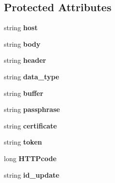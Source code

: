 \subsection*{Protected Attributes}
\begin{DoxyCompactItemize}
\item 
string {\bfseries host}\hypertarget{classRed_a881ca8a6ff3ead45a22065e1b08edc4b}{}\label{classRed_a881ca8a6ff3ead45a22065e1b08edc4b}

\item 
string {\bfseries body}\hypertarget{classRed_a0043c18dec9c06ebdceac6540bebbe4b}{}\label{classRed_a0043c18dec9c06ebdceac6540bebbe4b}

\item 
string {\bfseries header}\hypertarget{classRed_a2690f53997c6c06a8ac7368ab7ac7dad}{}\label{classRed_a2690f53997c6c06a8ac7368ab7ac7dad}

\item 
string {\bfseries data\+\_\+type}\hypertarget{classRed_a602ee25163d74672af4c85145bf0fdf9}{}\label{classRed_a602ee25163d74672af4c85145bf0fdf9}

\item 
string {\bfseries buffer}\hypertarget{classRed_a0fd124756fc391acb0654c0bfe78863e}{}\label{classRed_a0fd124756fc391acb0654c0bfe78863e}

\item 
string {\bfseries passphrase}\hypertarget{classRed_afae019c925bc03f8677fae565790df4c}{}\label{classRed_afae019c925bc03f8677fae565790df4c}

\item 
string {\bfseries certificate}\hypertarget{classRed_a41bc9de135ad663b712f590686fd7429}{}\label{classRed_a41bc9de135ad663b712f590686fd7429}

\item 
string {\bfseries token}\hypertarget{classRed_a91d52315a07d62a43da108d5913aed0c}{}\label{classRed_a91d52315a07d62a43da108d5913aed0c}

\item 
long {\bfseries H\+T\+T\+Pcode}\hypertarget{classRed_adca6abe192846a499c11144f8ac39b48}{}\label{classRed_adca6abe192846a499c11144f8ac39b48}

\item 
string {\bfseries id\+\_\+update}\hypertarget{classRed_af7cd75caf593e995872f8fd8412b1013}{}\label{classRed_af7cd75caf593e995872f8fd8412b1013}

\end{DoxyCompactItemize}


